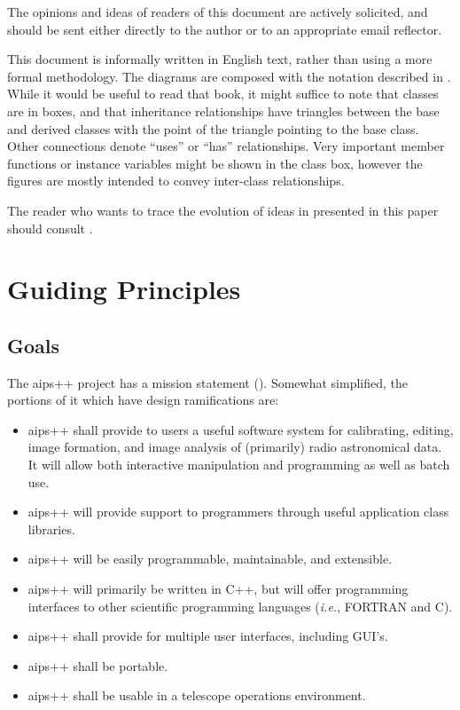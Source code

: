 The opinions and ideas of readers of this document are actively
solicited, and should be sent either directly to the author or to an
appropriate email reflector.

This document is informally written in English text, rather than using
a more formal methodology. The diagrams are composed with the notation
described in \cite{rumbaugh:oo}. While it would be useful to read that
book, it might suffice to note that classes are in boxes, and that
inheritance relationships have triangles between the base and derived
classes with the point of the triangle pointing to the base
class. Other connections denote ``uses'' or ``has'' relationships.
Very important member functions or instance variables might be shown
in the class box, however the figures are mostly intended to convey
inter-class relationships.

The reader who wants to trace the evolution of ideas in presented in
this paper should consult \cite{hg:design}.

\section{Guiding Principles\label{Coding:GuidingPrinciples}}
\subsection{Goals}

The {\sc aips++} project has a mission statement
(\cite{hunt:mission}).  Somewhat simplified, the portions of it which
have design ramifications are:

\begin{itemize}
\item {\sc aips++} shall provide to users a useful software system for calibrating, 
      editing, image formation, and  image analysis of (primarily) radio
      astronomical data. It will allow both interactive manipulation and
      programming as well as batch use.

\item {\sc aips++} will provide support to programmers through useful
     application class libraries. 

\item {\sc aips++} will be easily programmable, maintainable, and extensible.

\item {\sc aips++} will primarily be written in C++, but will offer
      programming interfaces to other scientific programming languages
      ({\em i.e.}, FORTRAN and C).

\item {\sc aips++}  shall provide for multiple user interfaces, including GUI's.

\item {\sc aips++} shall be portable.

\item {\sc aips++} shall be usable in a telescope operations environment.
\end{itemize}

